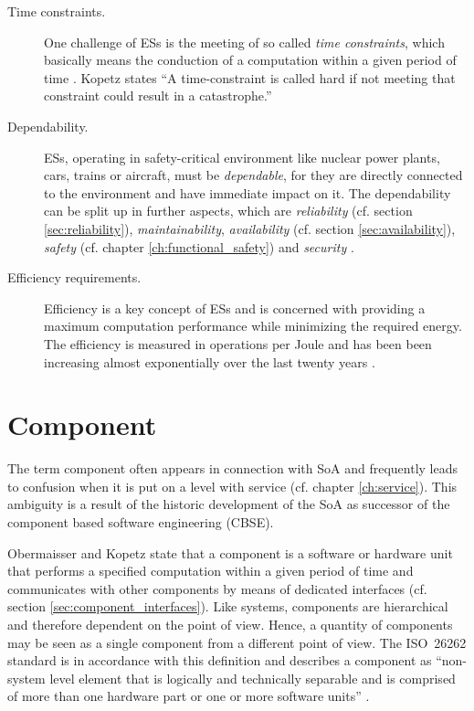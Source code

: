 \begin{description}
	\item [Time constraints.]
	One challenge of ESs is the meeting of so called \emph{time constraints}, which basically means the conduction of a computation within a given period of time \cite[p.8-9]{marwedel} \cite{rodrigues2011}. Kopetz \cite{kopetz} states ``A time-constraint is called hard if not meeting that constraint could result in a catastrophe.''
	\item [Dependability.]
	ESs, operating in safety-critical environment like nuclear power plants, cars, trains or aircraft, must be \emph{dependable}, for they are directly connected to the environment and have immediate impact on it. The dependability can be split up in further aspects, which are \emph{reliability} (cf. section \ref{sec:reliability}), \emph{maintainability}, \emph{availability} (cf. section \ref{sec:availability}), \emph{safety} (cf. chapter \ref{ch:functional_safety}) and \emph{security} \cite[p.4-5]{marwedel}.
	\item [Efficiency requirements.]
	Efficiency is a key concept of ESs and is concerned with providing a maximum computation performance while minimizing the required energy. The efficiency is measured in operations per Joule and has been been increasing almost exponentially over the last twenty years \cite{marwedel}.
\end{description}






\section{Component}
\label{ch:component}

The term component often appears in connection with SoA and frequently leads to confusion when it is put on a level with service (cf. chapter \ref{ch:service}). This ambiguity is a result of the historic development of the SoA as successor of the component based software engineering (CBSE).

Obermaisser and Kopetz state that a component is a software or hardware unit that performs a specified computation within a given period of time \cite[p.38]{genesys} and communicates with other components by means of dedicated interfaces (cf. section \ref{sec:component_interfaces}). Like systems, components are hierarchical and therefore dependent on the point of view. Hence, a quantity of components may be seen as a single component from a different point of view. The \mbox{ISO 26262} standard is in accordance with this definition and describes a component as ``non-system level element that is logically and technically separable and is comprised of more than one hardware part or one or more software units'' \cite{iso26262:1}.

